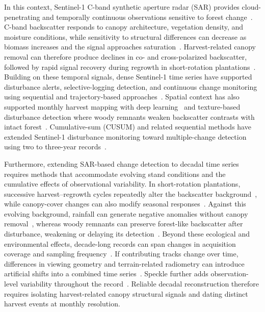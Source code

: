 In this context, Sentinel-1 C-band synthetic aperture radar (SAR) provides cloud-penetrating and temporally continuous observations sensitive to forest change~\citep{Torres2012S1,Reiche2021CongoAlerts,VanDerWoude2024ManagementDisturbance}. C-band backscatter responds to canopy architecture, vegetation density, and moisture conditions, while sensitivity to structural differences can decrease as biomass increases and the signal approaches saturation~\citep{Morin2019ForestStructure,Santoro2018SARBiomass}. Harvest-related canopy removal can therefore produce declines in co- and cross-polarized backscatter, followed by rapid signal recovery during regrowth in short-rotation plantations~\citep{Spracklen2021Acacia}. Building on these temporal signals, dense Sentinel-1 time series have supported disturbance alerts, selective-logging detection, and continuous change monitoring using sequential and trajectory-based approaches~\citep{Reiche2021CongoAlerts,Hethcoat2021SelectiveLogging,Bullock2022CCDC_S1}. Spatial context has also supported monthly harvest mapping with deep learning~\citep{Zhao2022MonthlyHarvest} and texture-based disturbance detection where woody remnants weaken backscatter contrasts with intact forest~\citep{Balling2023Texture}. Cumulative-sum (CUSUM) and related sequential methods have extended Sentinel-1 disturbance monitoring toward multiple-change detection using two to three-year records~\citep{RuizRamos2020CUSUMSMC,Ygorra2023ReCuSum,Ygorra2024CuSumNRT}.


Furthermore, extending SAR-based change detection to decadal time series requires methods that accommodate evolving stand conditions and the cumulative effects of observational variability. In short-rotation plantations, successive harvest--regrowth cycles repeatedly alter the backscatter background~\citep{Spracklen2021Acacia}, while canopy-cover changes can also modify seasonal responses~\citep{vanDerWoude2024S1Disturbance}. Against this evolving background, rainfall can generate negative anomalies without canopy removal~\citep{Doblas2020Rainfall}, whereas woody remnants can preserve forest-like backscatter after disturbance, weakening or delaying its detection~\citep{Balling2023Texture}. Beyond these ecological and environmental effects, decade-long records can span changes in acquisition coverage and sampling frequency~\citep{ESASentinel1Mission}. If contributing tracks change over time, differences in viewing geometry and terrain-related radiometry can introduce artificial shifts into a combined time series~\citep{Small2011RTC,Navacchi2025IncidenceAngle}. Speckle further adds observation-level variability throughout the record~\citep{Quegan2001Speckle}. Reliable decadal reconstruction therefore requires isolating harvest-related canopy structural signals and dating distinct harvest events at monthly resolution.



